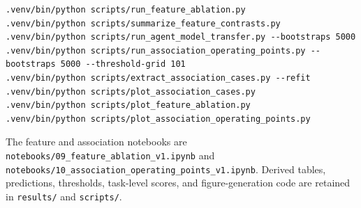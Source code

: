 \begin{verbatim}
.venv/bin/python scripts/run_feature_ablation.py
.venv/bin/python scripts/summarize_feature_contrasts.py
.venv/bin/python scripts/run_agent_model_transfer.py --bootstraps 5000
.venv/bin/python scripts/run_association_operating_points.py --bootstraps 5000 --threshold-grid 101
.venv/bin/python scripts/extract_association_cases.py --refit
.venv/bin/python scripts/plot_association_cases.py
.venv/bin/python scripts/plot_feature_ablation.py
.venv/bin/python scripts/plot_association_operating_points.py
\end{verbatim}

The feature and association notebooks are \texttt{notebooks/09\_feature\_ablation\_v1.ipynb} and \texttt{notebooks/10\_association\_operating\_points\_v1.ipynb}. Derived tables, predictions, thresholds, task-level scores, and figure-generation code are retained in \texttt{results/} and \texttt{scripts/}.
